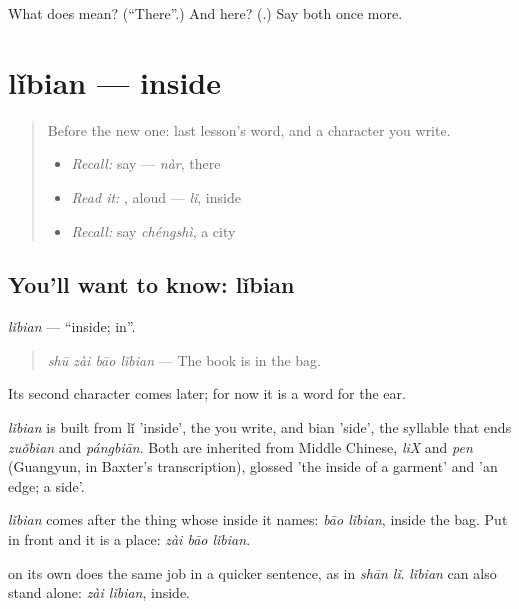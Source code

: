 \begin{tcolorbox}[breakable,colback=teal!4,colframe=teal!35!black,title={Before you move on}]
What does  mean? (\textquotedblleft{}There\textquotedblright{}.) And here? (\textbf{}.) Say both once more.
\end{tcolorbox}
\section[lǐbian]{lǐbian — inside}

\label{lesson:ZH-C85-libian}



\begin{quote}
Before the new one: last lesson's word, and a character you write.

\begin{itemize}
\raggedright
  \item \emph{Recall:} say  — \emph{nàr}, there
  \item \emph{Read it:} , aloud — \emph{lǐ}, inside
  \item \emph{Recall:} say \emph{chéngshì}, a city
\end{itemize}
\end{quote}

\subsection*{You'll want to know: lǐbian}
\emph{lǐbian} — \textquotedblleft{}inside; in\textquotedblright{}.

\begin{quote}
\emph{shū zài bāo lǐbian} — The book is in the bag.
\end{quote}

Its second character comes later; for now it is a word for the ear.

\begin{cousinweb}
\emph{lǐbian} is built from lǐ 'inside', the  you write, and bian 'side', the syllable that ends \emph{zuǒbian} and \emph{pángbiān}. Both are inherited from Middle Chinese, \emph{liX} and \emph{pen} (Guangyun, in Baxter's transcription), glossed 'the inside of a garment' and 'an edge; a side'.
\end{cousinweb}

\begin{grammarlens}[title={What you've built}]
\emph{lǐbian} comes after the thing whose inside it names: \emph{bāo lǐbian}, inside the bag. Put  in front and it is a place: \emph{zài bāo lǐbian}.

 on its own does the same job in a quicker sentence, as in \emph{shān lǐ}. \emph{lǐbian} can also stand alone: \emph{zài lǐbian}, inside.
\end{grammarlens}

